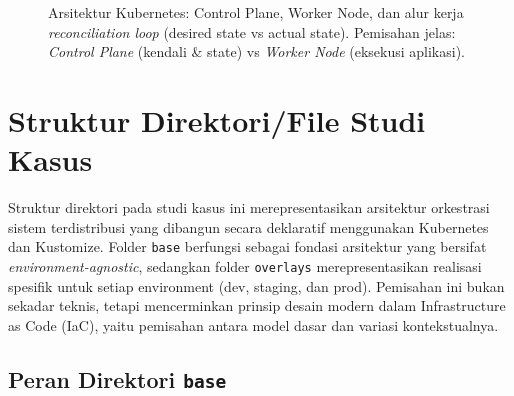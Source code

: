 \begin{figure}[h]
{%
}
\caption{Arsitektur Kubernetes: Control Plane, Worker Node, dan alur kerja \textit{reconciliation loop} (desired state vs actual state). Pemisahan jelas: \textit{Control Plane} (kendali \& state) vs \textit{Worker Node} (eksekusi aplikasi).}
\label{fig:k8s-architecture-reconcile}
\end{figure}


\section{Struktur Direktori/File Studi Kasus}

Struktur direktori pada studi kasus ini merepresentasikan arsitektur orkestrasi sistem terdistribusi yang dibangun secara deklaratif menggunakan Kubernetes dan Kustomize. Folder \texttt{base} berfungsi sebagai fondasi arsitektur yang bersifat \textit{environment-agnostic}, sedangkan folder \texttt{overlays} merepresentasikan realisasi spesifik untuk setiap environment (dev, staging, dan prod). Pemisahan ini bukan sekadar teknis, tetapi mencerminkan prinsip desain modern dalam Infrastructure as Code (IaC), yaitu pemisahan antara model dasar dan variasi kontekstualnya.

\subsection*{Peran Direktori \texttt{base}}

